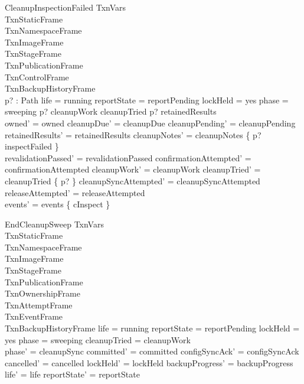 \documentclass{article}
\begin{document}
\begin{schema}{CleanupInspectionFailed}
	\Delta TxnVars \\
	TxnStaticFrame \\
	TxnNamespaceFrame \\
	TxnImageFrame \\
	TxnStageFrame \\
	TxnPublicationFrame \\
	TxnControlFrame \\
	TxnBackupHistoryFrame \\
	p? : Path
	\where
	life = running \land reportState = reportPending \land lockHeld = yes \land
	phase = sweeping \land p? \in \dom cleanupWork \setminus cleanupTried \land
	p? \notin \dom retainedResults \\
	owned' = owned \land cleanupDue' = cleanupDue \land
	cleanupPending' = cleanupPending \land retainedResults' = retainedResults \land
	cleanupNotes' = cleanupNotes \oplus \{ p? \mapsto inspectFailed \} \\
	revalidationPassed' = revalidationPassed \land
	confirmationAttempted' = confirmationAttempted \land
	cleanupWork' = cleanupWork \land cleanupTried' = cleanupTried \cup \{ p? \} \land
	cleanupSyncAttempted' = cleanupSyncAttempted \land releaseAttempted' = releaseAttempted \\
	events' = events \cup \{ cInspect \}
\end{schema}

\begin{schema}{EndCleanupSweep}
	\Delta TxnVars \\
	TxnStaticFrame \\
	TxnNamespaceFrame \\
	TxnImageFrame \\
	TxnStageFrame \\
	TxnPublicationFrame \\
	TxnOwnershipFrame \\
	TxnAttemptFrame \\
	TxnEventFrame \\
	TxnBackupHistoryFrame
	\where
	life = running \land reportState = reportPending \land lockHeld = yes \land
	phase = sweeping \land cleanupTried = \dom cleanupWork \\
	phase' = cleanupSync \land committed' = committed \land
	configSyncAck' = configSyncAck \land cancelled' = cancelled \land
	lockHeld' = lockHeld \land backupProgress' = backupProgress \land
	life' = life \land reportState' = reportState
\end{schema}
\end{document}
